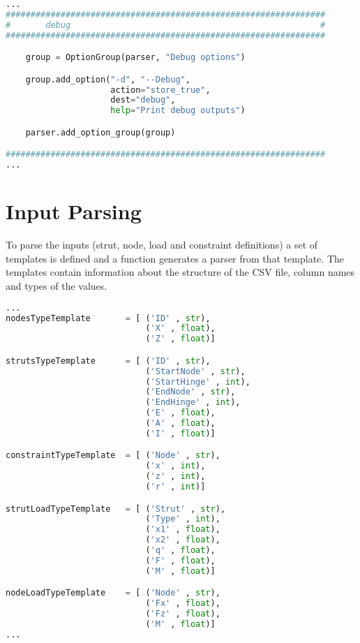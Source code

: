 \begin{inconsolata}
\begin{minipage}{\linewidth}
\begin{lstlisting}[language=python]
...
################################################################
#       debug                                                  #
################################################################

    group = OptionGroup(parser, "Debug options")

    group.add_option("-d", "--Debug",
                     action="store_true",
                     dest="debug",
                     help="Print debug outputs")

    parser.add_option_group(group)

################################################################
...
\end{lstlisting}
\end{minipage}
\end{inconsolata}


\section{Input Parsing}
\label{sec:inputpars}

To parse the inputs (strut, node, load and constraint definitions) a set of templates is defined and a function generates a parser from that template.
The templates contain information about the structure of the CSV file, column names and types of the values.

\begin{inconsolata}
\begin{minipage}{\linewidth}
\begin{lstlisting}[language=python]
...
nodesTypeTemplate       = [ ('ID' , str),
                            ('X' , float),
                            ('Z' , float)]

strutsTypeTemplate      = [ ('ID' , str),
                            ('StartNode' , str),
                            ('StartHinge' , int),
                            ('EndNode' , str),
                            ('EndHinge' , int),
                            ('E' , float),
                            ('A' , float),
                            ('I' , float)]

constraintTypeTemplate  = [ ('Node' , str),
                            ('x' , int),
                            ('z' , int),
                            ('r' , int)]

strutLoadTypeTemplate   = [ ('Strut' , str),
                            ('Type' , int),
                            ('x1' , float),
                            ('x2' , float),
                            ('q' , float),
                            ('F' , float),
                            ('M' , float)]

nodeLoadTypeTemplate    = [ ('Node' , str),
                            ('Fx' , float),
                            ('Fz' , float),
                            ('M' , float)]
...
\end{lstlisting}
\end{minipage}
\end{inconsolata}

